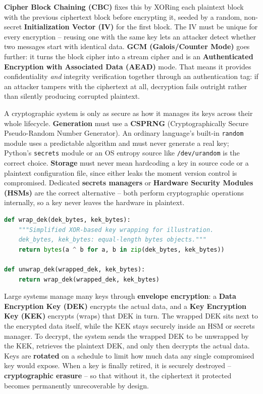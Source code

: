 \textbf{Cipher Block Chaining (CBC)} fixes this by XORing each plaintext block with the previous
ciphertext block before encrypting it, seeded by a random, non-secret \textbf{Initialization Vector
(IV)} for the first block. The IV must be unique for every encryption -- reusing one with
the same key lets an attacker detect whether two messages start with identical data. \textbf{GCM
(Galois/Counter Mode)} goes further: it turns the block cipher into a stream cipher and is an
\textbf{Authenticated Encryption with Associated Data (AEAD)} mode. That means it provides
confidentiality \emph{and} integrity verification together through an authentication tag: if an
attacker tampers with the ciphertext at all, decryption fails outright rather than silently
producing corrupted plaintext.

A cryptographic system is only as secure as how it manages its keys across their whole lifecycle.
\textbf{Generation} must use a \textbf{CSPRNG} (Cryptographically Secure Pseudo-Random Number
Generator). An ordinary language's built-in \texttt{random} module uses a predictable algorithm
and must never generate a real key; Python's \texttt{secrets} module or an OS entropy source like
\texttt{/dev/urandom} is the correct choice. \textbf{Storage} must never mean hardcoding a key in
source code or a plaintext configuration file, since either leaks the moment version control is
compromised. Dedicated \textbf{secrets managers} or \textbf{Hardware Security Modules (HSMs)} are the
correct alternative -- both perform cryptographic operations internally, so a key never leaves the
hardware in plaintext.

\begin{lstlisting}[language=Python, caption={Envelope encryption: wrapping a data key with a key-encryption key}]
def wrap_dek(dek_bytes, kek_bytes):
    """Simplified XOR-based key wrapping for illustration.
    dek_bytes, kek_bytes: equal-length bytes objects."""
    return bytes(a ^ b for a, b in zip(dek_bytes, kek_bytes))

def unwrap_dek(wrapped_dek, kek_bytes):
    return wrap_dek(wrapped_dek, kek_bytes)
\end{lstlisting}

Large systems manage many keys through \textbf{envelope encryption}: a \textbf{Data Encryption Key
(DEK)} encrypts the actual data, and a \textbf{Key Encryption Key (KEK)} encrypts (wraps) that DEK
in turn. The wrapped DEK sits next to the encrypted data itself, while the KEK stays securely inside
an HSM or secrets manager. To decrypt, the system sends the wrapped DEK to be unwrapped by the
KEK, retrieves the plaintext DEK, and only then decrypts the actual data. Keys are \textbf{rotated}
on a schedule to limit how much data any single compromised key would expose. When a key is
finally retired, it is securely destroyed -- \textbf{cryptographic erasure} -- so that without it,
the ciphertext it protected becomes permanently unrecoverable by design.

